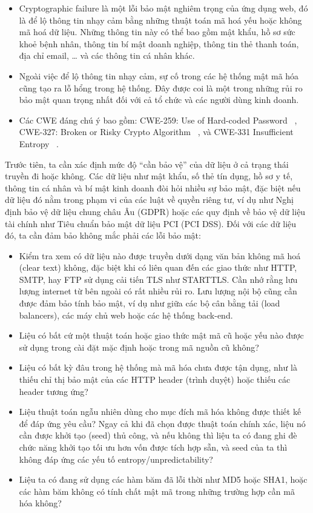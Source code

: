 \begin{itemize}
    \item Cryptographic failure là một lỗi bảo mật nghiêm trọng của ứng dụng web, đó là để lộ thông tin nhạy cảm bằng những thuật toán mã hoá yếu hoặc không mã hoá dữ liệu. Những thông tin này có thể bao gồm mật khẩu, hồ sơ sức khoẻ bệnh nhân, thông tin bí mật doanh nghiệp, thông tin thẻ thanh toán, địa chỉ email, … và các thông tin cá nhân khác.
    \item Ngoài việc để lộ thông tin nhạy cảm, sự cố trong các hệ thống mật mã hóa cũng tạo ra lỗ hổng trong hệ thống. Đây được coi là một trong những rủi ro bảo mật quan trọng nhất đối với cả tổ chức và các người dùng kinh doanh.
    \item Các CWE đáng chú ý bao gồm: CWE-259: Use of Hard-coded Password ~\cite{chap2bib9}, CWE-327: Broken or Risky Crypto Algorithm ~\cite{chap2bib10}, và CWE-331 Insufficient Entropy ~\cite{chap2bib11}.
\end{itemize}

\tab \tab Trước tiên, ta cần xác định mức độ “cần bảo vệ” của dữ liệu ở cả trạng thái truyền đi hoặc không. Các dữ liệu như mật khẩu, số thẻ tín dụng, hồ sơ y tế, thông tin cá nhân và bí mật kinh doanh đòi hỏi nhiều sự bảo mật, đặc biệt nếu dữ liệu đó nằm trong phạm vi của các luật về quyền riêng tư, ví dụ như Nghị định bảo vệ dữ liệu chung châu Âu (GDPR) hoặc các quy định về bảo vệ dữ liệu tài chính như Tiêu chuẩn bảo mật dữ liệu PCI (PCI DSS). Đối với các dữ liệu đó, ta cần đảm bảo không mắc phải các lỗi bảo mật:

\begin{itemize}
    \item Kiểm tra xem có dữ liệu nào được truyền dưới dạng văn bản không mã hoá (clear text) không, đặc biệt khi có liên quan đến các giao thức như HTTP, SMTP, hay FTP sử dụng cải tiến TLS như STARTTLS. Cần nhớ rằng lưu lượng internet từ bên ngoài có rất nhiều rủi ro. Lưu lượng nội bộ cũng cần được đảm bảo tính bảo mật, ví dụ như giữa các bộ cân bằng tải (load balancers), các máy chủ web hoặc các hệ thống back-end.
    \item Liệu có bất cứ một thuật toán hoặc giao thức mật mã cũ hoặc yếu nào được sử dụng trong cài đặt mặc định hoặc trong mã nguồn cũ không?
    \item Liệu có bất kỳ đâu trong hệ thống mà mã hóa chưa được tận dụng, như là thiếu chỉ thị bảo mật của các HTTP header (trình duyệt) hoặc thiếu các header tương ứng?
    \item Liệu thuật toán ngẫu nhiên dùng cho mục đích mã hóa không được thiết kế để đáp ứng yêu cầu? Ngay cả khi đã chọn được thuật toán chính xác, liệu nó cần được khởi tạo (seed) thủ công, và nếu không thì liệu ta có đang ghi đè chức năng khởi tạo tối ưu hơn vốn được tích hợp sẵn, và seed của ta thì không đáp ứng các yếu tố entropy/unpredictability?
    \item Liệu ta có đang sử dụng các hàm băm đã lỗi thời như MD5 hoặc SHA1, hoặc các hàm băm không có tính chất mật mã trong những trường hợp cần mã hóa không?
\end{itemize}

